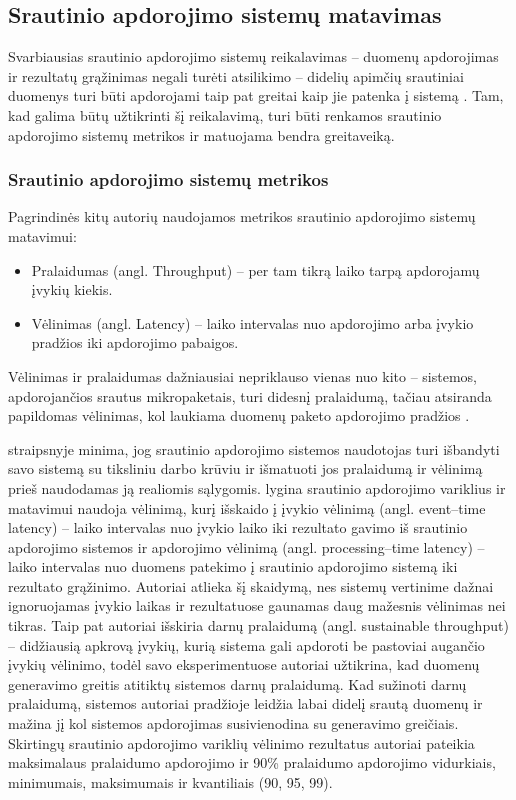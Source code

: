\documentclass{VUMIFPSbakalaurinis}
\begin{document}
\subsection{Srautinio apdorojimo sistemų matavimas}
Svarbiausias srautinio apdorojimo sistemų reikalavimas – duomenų apdorojimas ir rezultatų grąžinimas negali turėti atsilikimo – didelių apimčių srautiniai duomenys turi būti apdorojami taip pat greitai kaip jie patenka į sistemą \cite{stonebraker20058}. Tam, kad galima būtų užtikrinti šį reikalavimą, turi būti renkamos srautinio apdorojimo sistemų metrikos ir matuojama bendra greitaveiką.

\subsubsection{Srautinio apdorojimo sistemų metrikos}
Pagrindinės kitų autorių naudojamos metrikos srautinio apdorojimo sistemų matavimui:
\begin{itemize}
    \item Pralaidumas (angl. Throughput) – per tam tikrą laiko tarpą apdorojamų įvykių kiekis.
    \item Vėlinimas (angl. Latency) – laiko intervalas nuo apdorojimo arba įvykio pradžios iki apdorojimo pabaigos.
\end{itemize}
Vėlinimas ir pralaidumas dažniausiai nepriklauso vienas nuo kito – sistemos, apdorojančios srautus mikropaketais, turi didesnį pralaidumą, tačiau atsiranda papildomas vėlinimas, kol laukiama duomenų paketo apdorojimo pradžios \cite{Karimov2018BenchmarkingDS}. \par

\cite{stonebraker20058} straipsnyje minima, jog srautinio apdorojimo sistemos naudotojas turi išbandyti savo sistemą su tiksliniu darbo krūviu ir išmatuoti jos pralaidumą ir vėlinimą prieš naudodamas ją realiomis sąlygomis. \cite{Karimov2018BenchmarkingDS} lygina srautinio apdorojimo variklius ir matavimui naudoja vėlinimą, kurį išskaido į įvykio vėlinimą (angl. event–time latency) – laiko intervalas nuo įvykio laiko iki rezultato gavimo iš srautinio apdorojimo sistemos ir apdorojimo vėlinimą (angl. processing–time latency) – laiko intervalas nuo duomens patekimo į srautinio apdorojimo sistemą iki rezultato grąžinimo. Autoriai atlieka šį skaidymą, nes sistemų vertinime dažnai ignoruojamas įvykio laikas ir rezultatuose gaunamas daug mažesnis vėlinimas nei tikras. Taip pat autoriai išskiria darnų pralaidumą (angl. sustainable throughput) – didžiausią apkrovą įvykių, kurią sistema gali apdoroti be pastoviai augančio įvykių vėlinimo, todėl savo eksperimentuose autoriai užtikrina, kad duomenų generavimo greitis atitiktų sistemos darnų pralaidumą. Kad sužinoti darnų pralaidumą, sistemos autoriai pradžioje leidžia labai didelį srautą duomenų ir mažina jį kol sistemos apdorojimas susivienodina su generavimo greičiais. Skirtingų srautinio apdorojimo variklių vėlinimo rezultatus autoriai pateikia maksimalaus pralaidumo apdorojimo ir 90\% pralaidumo apdorojimo vidurkiais, minimumais, maksimumais ir kvantiliais (90, 95, 99). 
\end{document}
